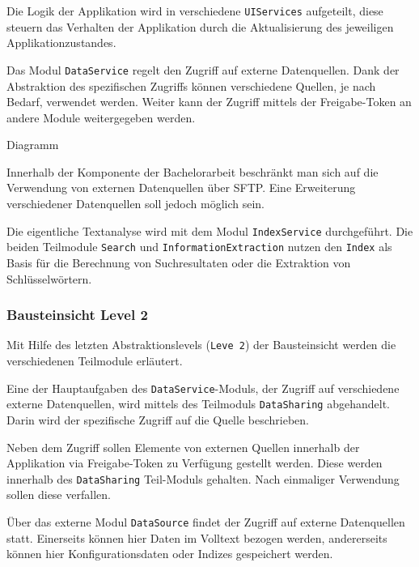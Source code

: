 Die Logik der Applikation wird in verschiedene \texttt{UIServices} aufgeteilt, diese steuern das Verhalten der Applikation durch die Aktualisierung des jeweiligen Applikationzustandes.

Das Modul \texttt{DataService} regelt den Zugriff auf externe Datenquellen. Dank der Abstraktion des spezifischen Zugriffs können verschiedene Quellen, je nach Bedarf, verwendet werden. Weiter kann der Zugriff mittels der Freigabe-Token an andere Module weitergegeben werden. %

Diagramm

Innerhalb der Komponente der Bachelorarbeit beschränkt man sich auf die Verwendung von externen Datenquellen über \gls{SFTP}. Eine Erweiterung verschiedener Datenquellen soll jedoch möglich sein.

Die eigentliche Textanalyse wird mit dem Modul \texttt{IndexService} durch\-ge\-führt. Die beiden Teilmodule \texttt{Search} und \texttt{InformationExtraction} nutzen den \texttt{Index} als Basis für die Berechnung von Suchresultaten oder die Extraktion von Schlüsselwörtern.

\subsubsection{Bausteinsicht Level 2}
Mit Hilfe des letzten Abstraktionslevels (\texttt{Leve 2}) der Bausteinsicht werden die verschiedenen Teilmodule erläutert.

Eine der Hauptaufgaben des \texttt{DataService}-Moduls, der Zugriff auf verschiedene externe Datenquellen, wird mittels des Teilmoduls \texttt{Data\-Sharing} abgehandelt. Darin wird der spezifische Zugriff auf die Quelle beschrieben.

Neben dem Zugriff sollen Elemente von externen Quellen innerhalb der Applikation via Freigabe-Token zu Verfügung gestellt werden. Diese werden innerhalb des \texttt{DataSharing} Teil-Moduls gehalten. Nach einmaliger Verwendung sollen diese verfallen.

Über das externe Modul \texttt{DataSource} findet der Zugriff auf externe Datenquellen statt. Einerseits können hier Daten im Volltext bezogen werden, andererseits können hier Konfigurationsdaten oder Indizes gespeichert werden.

